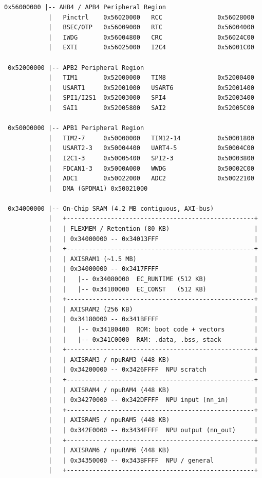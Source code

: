 \begin{lstlisting}[language={}, caption={CPU-Adressraum des Cortex-M55}, label={lst:cpu-adressraum}, numbers=none]
 0x56000000 |-- AHB4 / APB4 Peripheral Region
            |   Pinctrl    0x56020000   RCC               0x56028000
            |   BSEC/OTP   0x56009000   RTC               0x56004000
            |   IWDG       0x56004800   CRC               0x56024C00
            |   EXTI       0x56025000   I2C4              0x56001C00

 0x52000000 |-- APB2 Peripheral Region
            |   TIM1       0x52000000   TIM8              0x52000400
            |   USART1     0x52001000   USART6            0x52001400
            |   SPI1/I2S1  0x52003000   SPI4              0x52003400
            |   SAI1       0x52005800   SAI2              0x52005C00

 0x50000000 |-- APB1 Peripheral Region
            |   TIM2-7     0x50000000   TIM12-14          0x50001800
            |   USART2-3   0x50004400   UART4-5           0x50004C00
            |   I2C1-3     0x50005400   SPI2-3            0x50003800
            |   FDCAN1-3   0x5000A000   WWDG              0x50002C00
            |   ADC1       0x50022000   ADC2              0x50022100
            |   DMA (GPDMA1) 0x50021000

 0x34000000 |-- On-Chip SRAM (4.2 MB contiguous, AXI-bus)
            |   +---------------------------------------------------+
            |   | FLEXMEM / Retention (80 KB)                       |
            |   | 0x34000000 -- 0x34013FFF                          |
            |   +---------------------------------------------------+
            |   | AXISRAM1 (~1.5 MB)                                |
            |   | 0x34000000 -- 0x3417FFFF                          |
            |   |   |-- 0x34080000  EC_RUNTIME (512 KB)             |
            |   |   |-- 0x34100000  EC_CONST   (512 KB)             |
            |   +---------------------------------------------------+
            |   | AXISRAM2 (256 KB)                                 |
            |   | 0x34180000 -- 0x341BFFFF                          |
            |   |   |-- 0x34180400  ROM: boot code + vectors        |
            |   |   |-- 0x341C0000  RAM: .data, .bss, stack         |
            |   +---------------------------------------------------+
            |   | AXISRAM3 / npuRAM3 (448 KB)                       |
            |   | 0x34200000 -- 0x3426FFFF  NPU scratch             |
            |   +---------------------------------------------------+
            |   | AXISRAM4 / npuRAM4 (448 KB)                       |
            |   | 0x34270000 -- 0x342DFFFF  NPU input (nn_in)       |
            |   +---------------------------------------------------+
            |   | AXISRAM5 / npuRAM5 (448 KB)                       |
            |   | 0x342E0000 -- 0x3434FFFF  NPU output (nn_out)     |
            |   +---------------------------------------------------+
            |   | AXISRAM6 / npuRAM6 (448 KB)                       |
            |   | 0x34350000 -- 0x343BFFFF  NPU / general           |
            |   +---------------------------------------------------+


\end{lstlisting}
